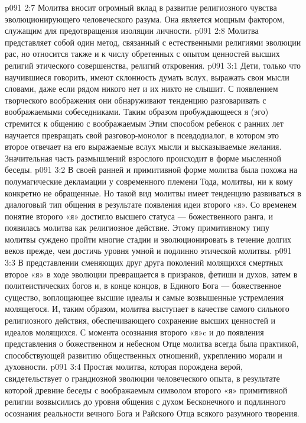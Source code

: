 \vs p091 2:7 Молитва вносит огромный вклад в развитие религиозного чувства эволюционирующего человеческого разума. Она является мощным фактором, служащим для предотвращения изоляции личности.
\vs p091 2:8 Молитва представляет собой один метод, связанный с естественными религиями эволюции рас, но относится также и к числу обретенных с опытом ценностей высших религий этического совершенства, религий откровения.
\vs p091 3:1 Дети, только что научившиеся говорить, имеют склонность думать вслух, выражать свои мысли словами, даже если рядом никого нет и их никто не слышит. С появлением творческого воображения они обнаруживают тенденцию разговаривать с воображаемыми собеседниками. Таким образом пробуждающееся я (эго) стремится к общению с воображаемым  Этим способом ребенок с ранних лет научается превращать свой разговор\hyp{}монолог в псевдодиалог, в котором это второе  отвечает на его выражаемые вслух мысли и высказываемые желания. Значительная часть размышлений взрослого происходит в форме мысленной беседы.
\vs p091 3:2 В своей ранней и примитивной форме молитва была похожа на полумагические декламации у современного племени Тода, молитвы, ни к кому конкретно не обращенные. Но такой вид молитвы имеет тенденцию развиваться в диалоговый тип общения в результате появления идеи второго «я». Со временем понятие второго «я» достигло высшего статуса --- божественного ранга, и появилась молитва как религиозное действие. Этому примитивному типу молитвы суждено пройти многие стадии и эволюционировать в течение долгих веков прежде, чем достичь уровня умной и подлинно этической молитвы.
\vs p091 3:3 В представлении сменяющих друг друга поколений молящихся смертных второе «я» в ходе эволюции превращается в призраков, фетиши и духов, затем в политеистических богов и, в конце концов, в Единого Бога --- божественное существо, воплощающее высшие идеалы и самые возвышенные устремления молящегося. И, таким образом, молитва выступает в качестве самого сильного религиозного действия, обеспечивающего сохранение высших ценностей и идеалов молящихся. С момента осознания второго «я»c и до появления представления о божественном и небесном Отце молитва всегда была практикой, способствующей развитию общественных отношений, укреплению морали и духовности.
\vs p091 3:4 Простая молитва, которая порождена верой, свидетельствует о грандиозной эволюции человеческого опыта, в результате которой древние беседы с воображаемым символом второго «я» примитивной религии возвысились до уровня общения с духом Бесконечного и подлинного осознания реальности вечного Бога и Райского Отца всякого разумного творения.
